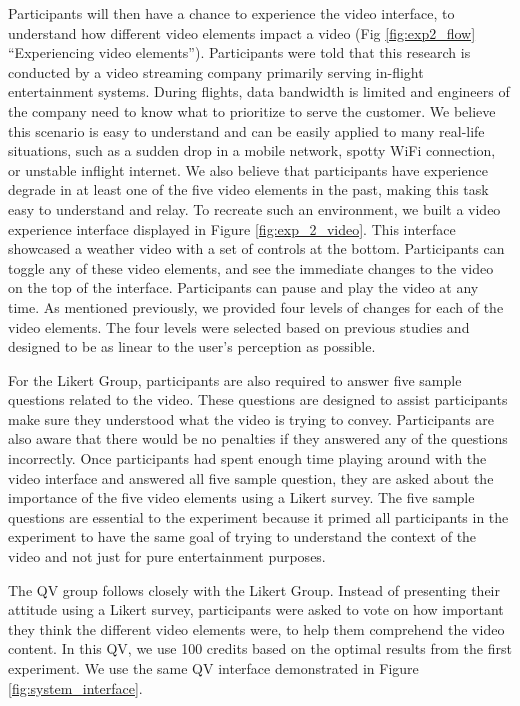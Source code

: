 Participants will then have a chance to experience the video interface, to understand how different video elements impact a video (Fig \ref{fig:exp2_flow} ``Experiencing video elements'').
Participants were told that this research is conducted by a video streaming company primarily serving in-flight entertainment systems.
During flights, data bandwidth is limited and engineers of the company need to know what to prioritize to serve the customer.
We believe this scenario is easy to understand and can be easily applied to many real-life situations, such as a sudden drop in a mobile network, spotty WiFi connection, or unstable inflight internet.
We also believe that participants have experience degrade in at least one of the five video elements in the past, making this task easy to understand and relay.
To recreate such an environment, we built a video experience interface displayed in Figure \ref{fig:exp_2_video}.
This interface showcased a weather video with a set of controls at the bottom.
Participants can toggle any of these video elements, and see the immediate changes to the video on the top of the interface.
Participants can pause and play the video at any time.
As mentioned previously, we provided four levels of changes for each of the video elements. 
The four levels were selected based on previous studies and designed to be as linear to the user's perception as possible. 

For the Likert Group,
participants are also required to answer five sample questions
related to the video.
These questions are designed to assist participants
make sure they understood what the video is trying to convey.
Participants are also aware that 
there would be no penalties if they answered any of the questions incorrectly.
Once participants had spent enough time playing around with the video interface
and answered all five sample question, 
they are asked about the importance of the five video elements
using a Likert survey.
The five sample questions are essential to the experiment
because it primed all participants in the experiment to have the same goal of 
trying to understand the context of the video
and not just for pure entertainment purposes.

The QV group follows closely with the Likert Group.
Instead of presenting their attitude using a Likert survey,
participants were asked to vote on how important they think
the different video elements were,
to help them comprehend the video content.
In this QV, we use 100 credits based on the optimal
results from the first experiment.
We use the same QV interface demonstrated in Figure \ref{fig:system_interface}.

